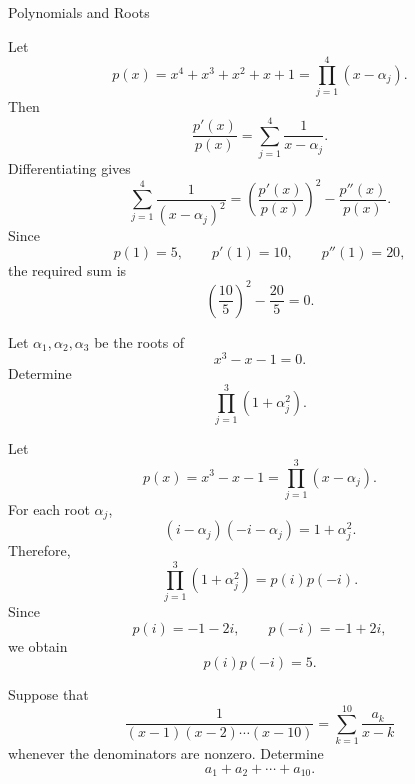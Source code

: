 \begin{expectedproblemgroup}{Polynomials and Roots}
        \begin{expectedsubsolution}
            Let
            \[
                p(x)=x^4+x^3+x^2+x+1
                =
                \prod_{j=1}^{4}(x-\alpha_j).
            \]
            Then
            \[
                \frac{p'(x)}{p(x)}
                =
                \sum_{j=1}^{4}\frac{1}{x-\alpha_j}.
            \]
            Differentiating gives
            \[
                \sum_{j=1}^{4}\frac{1}{(x-\alpha_j)^2}
                =
                \left(\frac{p'(x)}{p(x)}\right)^2
                -
                \frac{p''(x)}{p(x)}.
            \]
            Since
            \[
                p(1)=5,
                \qquad
                p'(1)=10,
                \qquad
                p''(1)=20,
            \]
            the required sum is
            \[
                \boxed{\left(\frac{10}{5}\right)^2-\frac{20}{5}=0}.
            \]
        \end{expectedsubsolution}

        \begin{expectedsubproblem}
            Let $\alpha_1,\alpha_2,\alpha_3$ be the roots of
            \[
                x^3-x-1=0.
            \]
            Determine
            \[
                \prod_{j=1}^{3}(1+\alpha_j^2).
            \]
        \end{expectedsubproblem}

        \begin{expectedsubsolution}
            Let
            \[
                p(x)=x^3-x-1
                =
                \prod_{j=1}^{3}(x-\alpha_j).
            \]
            For each root $\alpha_j$,
            \[
                (i-\alpha_j)(-i-\alpha_j)=1+\alpha_j^2.
            \]
            Therefore,
            \[
                \prod_{j=1}^{3}(1+\alpha_j^2)
                =
                p(i)p(-i).
            \]
            Since
            \[
                p(i)=-1-2i,
                \qquad
                p(-i)=-1+2i,
            \]
            we obtain
            \[
                \boxed{p(i)p(-i)=5}.
            \]
        \end{expectedsubsolution}

        \begin{expectedsubproblem}[1995 CSAT]
            Suppose that
            \[
                \frac{1}{(x-1)(x-2)\cdots(x-10)}
                =
                \sum_{k=1}^{10}\frac{a_k}{x-k}
            \]
            whenever the denominators are nonzero. Determine
            \[
                a_1+a_2+\cdots+a_{10}.
            \]
        \end{expectedsubproblem}


\end{expectedproblemgroup}
